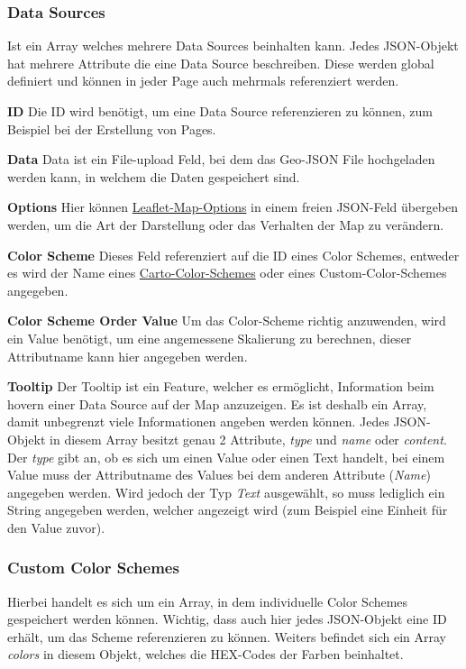\subsubsection{Data Sources}
Ist ein Array welches mehrere Data Sources beinhalten kann.
Jedes JSON-Objekt hat mehrere Attribute die eine Data Source beschreiben.
Diese werden global definiert und können in jeder Page auch mehrmals referenziert werden.

\textbf{ID}
Die ID wird benötigt, um eine Data Source referenzieren zu können, zum Beispiel bei der Erstellung von Pages.

\textbf{Data}
Data ist ein File-upload Feld, bei dem das Geo-JSON File hochgeladen werden kann, in welchem die Daten gespeichert sind.

\textbf{Options}
Hier können \href{https://leafletjs.com/SlavaUkraini/reference.html#map-option}{Leaflet-Map-Options} in einem freien JSON-Feld
übergeben werden, um die Art der Darstellung oder das Verhalten der Map zu verändern.

\textbf{Color Scheme}
Dieses Feld referenziert auf die ID eines Color Schemes, entweder es wird der Name eines
\href{https://carto.com/carto-colors/}{Carto-Color-Schemes} oder eines Custom-Color-Schemes angegeben.

\textbf{Color Scheme Order Value}
Um das Color-Scheme richtig anzuwenden, wird ein Value benötigt, um eine angemessene Skalierung zu berechnen, dieser Attributname
kann hier angegeben werden.

\textbf{Tooltip}
Der Tooltip ist ein Feature, welcher es ermöglicht, Information beim hovern einer Data Source auf der Map anzuzeigen.
Es ist deshalb ein Array, damit unbegrenzt viele Informationen angeben werden können.
Jedes JSON-Objekt in diesem Array besitzt genau 2 Attribute, \emph{type} und \emph{name} oder \emph{content}.
Der \emph{type} gibt an, ob es sich um einen Value oder einen Text handelt, bei einem Value muss der Attributname des
Values bei dem anderen Attribute (\emph{Name}) angegeben werden.
Wird jedoch der Typ \emph{Text} ausgewählt, so muss lediglich ein String angegeben werden, welcher angezeigt wird (zum Beispiel
eine Einheit für den Value zuvor).

\subsubsection{Custom Color Schemes}
Hierbei handelt es sich um ein Array, in dem individuelle Color Schemes gespeichert werden können.
Wichtig, dass auch hier jedes JSON-Objekt eine ID erhält, um das Scheme referenzieren zu können.
Weiters befindet sich ein Array \emph{colors} in diesem Objekt, welches die HEX-Codes der Farben beinhaltet.

